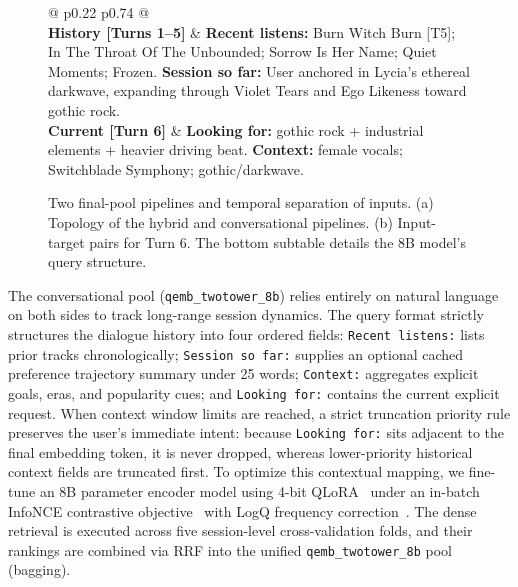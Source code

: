 \documentclass[sigconf]{acmart}
\begin{document}
\begin{figure}[t]
  \begin{tabular*}{\linewidth}{@{\extracolsep{\fill}} p{0.22\linewidth} p{0.74\linewidth} @{}}
    \toprule
     \\
    \midrule
    \textbf{History [Turns 1--5]} & 
    \textbf{Recent listens:} Burn Witch Burn [T5]; In The Throat Of The Unbounded; Sorrow Is Her Name; Quiet Moments; Frozen. \newline
    \textbf{Session so far:} User anchored in Lycia's ethereal darkwave, expanding through Violet Tears and Ego Likeness toward gothic rock. \\
    \midrule
    \textbf{Current [Turn 6]} & 
    \textbf{Looking for:} gothic rock + industrial elements + heavier driving beat. \newline
    \textbf{Context:} female vocals; Switchblade Symphony; gothic/darkwave. \\
    \bottomrule
  \end{tabular*}
  \caption{Two final-pool pipelines and temporal separation of inputs. (a) Topology of the hybrid and conversational pipelines. (b) Input-target pairs for Turn 6. The bottom subtable details the 8B model's query structure.}
  \label{fig:textviews}
\end{figure}

The conversational pool (\texttt{qemb\_twotower\_8b}) relies entirely on natural language on both sides to track long-range session dynamics. The query format strictly structures the dialogue history into four ordered fields: \texttt{Recent listens:} lists prior tracks chronologically; \texttt{Session so far:} supplies an optional cached preference trajectory summary under 25 words; \texttt{Context:} aggregates explicit goals, eras, and popularity cues; and \texttt{Looking for:} contains the current explicit request. When context window limits are reached, a strict truncation priority rule preserves the user's immediate intent: because \texttt{Looking for:} sits adjacent to the final embedding token, it is never dropped, whereas lower-priority historical context fields are truncated first. To optimize this contextual mapping, we fine-tune an 8B parameter encoder model using 4-bit QLoRA~\cite{dettmers2023qlora} under an in-batch InfoNCE contrastive objective~\cite{oord2018cpc} with LogQ frequency correction~\cite{yi2019sampling}. The dense retrieval is executed across five session-level cross-validation folds, and their rankings are combined via RRF into the unified \texttt{qemb\_twotower\_8b} pool (bagging).
\end{document}
